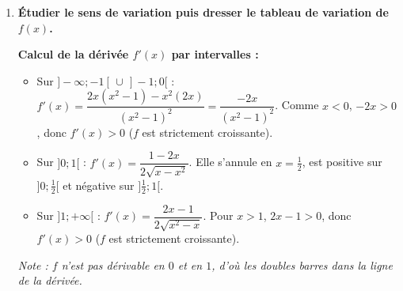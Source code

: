 \documentclass[12pt,a4paper]{article}
\begin{document}
\begin{enumerate}
    Pour $x \ge 1$, $f(x) = \sqrt{x^2-x}$. Multiplions par l'expression conjuguée :
    \[ f(x) - \left(x - \frac{1}{2}\right) = \frac{(x^2-x) - \left(x - \frac{1}{2}\right)^2}{\sqrt{x^2-x} + \left(x - \frac{1}{2}\right)} \]
    Or $\left(x - \frac{1}{2}\right)^2 = x^2 - x + \frac{1}{4}$. Le numérateur se simplifie en $-\dfrac{1}{4}$. Ainsi :
    \[ \lim_{x \to +\infty} \left[f(x) - \left(x - \frac{1}{2}\right)\right] = \lim_{x \to +\infty} \frac{-\frac{1}{4}}{\sqrt{x^2-x} + x - \frac{1}{2}} = 0 \]
    La droite $(D) : y = x - \dfrac{1}{2}$ est donc \textbf{asymptote oblique à $(C_f)$ en $+\infty$}.

    \item \textbf{Étudier le sens de variation puis dresser le tableau de variation de $f(x)$.}
    
    \textbf{Calcul de la dérivée $f'(x)$ par intervalles :}
    \begin{itemize}
        \item Sur $]-\infty; -1[ \,\cup\, ]-1; 0[$ : $f'(x) = \dfrac{2x(x^2-1)-x^2(2x)}{(x^2-1)^2} = \dfrac{-2x}{(x^2-1)^2}$. Comme $x < 0$, $-2x > 0$, donc $f'(x) > 0$ ($f$ est strictement croissante).
        \item Sur $]0; 1[$ : $f'(x) = \dfrac{1-2x}{2\sqrt{x-x^2}}$. Elle s'annule en $x = \frac{1}{2}$, est positive sur $]0; \frac{1}{2}[$ et négative sur $]\frac{1}{2}; 1[$.
        \item Sur $]1; +\infty[$ : $f'(x) = \dfrac{2x-1}{2\sqrt{x^2-x}}$. Pour $x > 1$, $2x-1 > 0$, donc $f'(x) > 0$ ($f$ est strictement croissante).
    \end{itemize}
    \textit{Note : $f$ n'est pas dérivable en $0$ et en $1$, d'où les doubles barres dans la ligne de la dérivée.}

    \begin{center}
    \end{center}
\end{enumerate}
\end{document}
